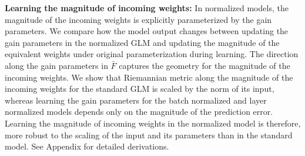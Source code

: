 \documentclass{article}
\newcommand{\cut}[1]{}
\newcommand{\fisher}{{F}}
\begin{document}
{\textbf{Learning the magnitude of incoming weights:}}
In normalized models, the magnitude of the incoming weights is explicitly parameterized by the gain parameters. We compare how the model output changes between updating the gain parameters in the normalized GLM and updating the magnitude of the equivalent weights under original parameterization during learning. The direction along the gain parameters in $\bar{\fisher}$ captures the geometry for the magnitude of the incoming weights.  We show that Riemannian metric along the magnitude of the incoming weights for the standard GLM is scaled by the norm of its input, whereas learning the gain parameters for the batch normalized and layer normalized models depends only on the magnitude of the prediction error.  Learning the magnitude of incoming weights in the normalized model is therefore, more robust to the scaling of the input and its parameters than in the standard model. See Appendix for detailed derivations. \cut{The magnitude of the weights are explicitly parameterized using the gain parameter in the normalized model. We project the gradient updates to the weight vector for the normal GLM.}
\end{document}
